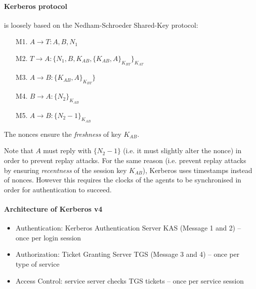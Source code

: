 \paragraph{Kerberos protocol} is loosely based on the Nedham-Schroeder Shared-Key protocol:
\begin{itemize}[leftmargin=4cm]
    \item [M1.] $A \rightarrow T: A, B, N_1$
    \item [M2.] $T \rightarrow A: \{ N_1, B, K_{AB}, \{ K_{AB}, A\}_{K_{BT}} \} _{K_{AT}}$
    \item [M3.] $A \rightarrow B:  \{K_{AB}, A\} _{K_{BT}} \}$
    \item [M4.] $B \rightarrow A: \{N_2\}_{K_{AB}}$
    \item [M5.] $A \rightarrow B: \{N_2-1\}_{K_{AB}} $
\end{itemize}

The nonces ensure the \emph{freshness} of key ${K_{AB}}$.

Note that $A$ must reply with $\{N_2-1\}$ (i.e. it must slightly alter the nonce) in order to prevent replay attacks. For the same reason (i.e. prevent replay attacks by ensuring \emph{recentness} of the session key $K_{AB}$), Kerberos uses timestamps instead of nonces. However this requires the clocks of the agents to be synchronised in order for authentication to succeed.

\paragraph{Architecture of Kerberos v4}
\begin{itemize}
    \item Authentication: Kerberos Authentication Server KAS (Message 1 and 2) -- once per login session
    \item Authorization: Ticket Granting Server TGS (Message 3 and 4) -- once per type of service
    \item Access Control: service server checks TGS tickets -- once per service session
\end{itemize}

